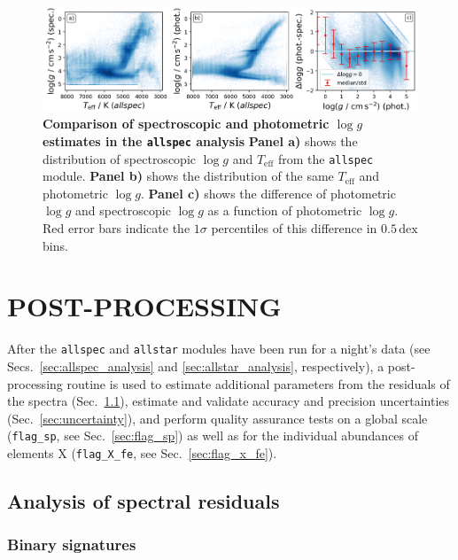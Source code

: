 \documentclass[
  journal=pasa,
  manuscript=research-paper, %
  year=2024,
  volume=37
]{cup-journal}
\newcommand{\Teff}{$T_\mathrm{eff}$\xspace}
\newcommand{\logg}{$\log g$\xspace}
\begin{document}
\begin{figure}[ht]
\centering
\includegraphics[width=\textwidth]{figures/dlogg_spec_plx.png}
\caption{\textbf{Comparison of spectroscopic and photometric \logg estimates in the \texttt{allspec} analysis}
\textbf{Panel a)} shows the distribution of spectroscopic \logg and \Teff from the \texttt{allspec} module.
\textbf{Panel b)} shows the distribution of the same \Teff and photometric \logg.
\textbf{Panel c)} shows the difference of photometric \logg and spectroscopic \logg as a function of photometric \logg. Red error bars indicate the $1\sigma$ percentiles of this difference in $0.5\,\mathrm{dex}$ bins.}
\label{fig:dlogg_spec_plx}
\end{figure}

\section{POST-PROCESSING}
\label{sec:post_processing}

After the \texttt{allspec} and  \texttt{allstar} modules have been run for a night's data (see Secs.~\ref{sec:allspec_analysis} and \ref{sec:allstar_analysis}, respectively), a post-processing routine is used to estimate additional parameters from the residuals of the spectra (Sec.~\ref{sec:residual_analysis}), estimate and validate accuracy and precision uncertainties (Sec.~\ref{sec:uncertainty}), and perform quality assurance tests on a global scale (\texttt{flag\_sp}, see Sec.~\ref{sec:flag_sp}) as well as for the individual abundances of elements X (\texttt{flag\_X\_fe}, see Sec.~\ref{sec:flag_x_fe}).

\subsection{Analysis of spectral residuals} \label{sec:residual_analysis}

\subsubsection{Binary signatures} \label{sec:trigger_binary_module}
\end{document}

